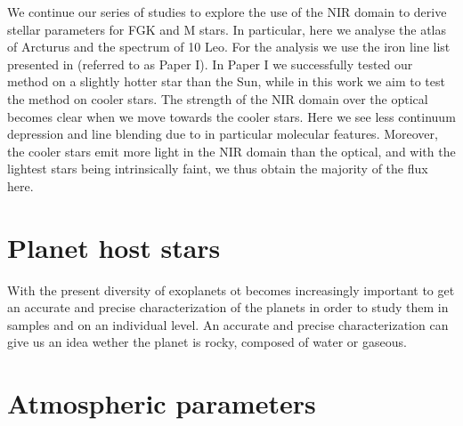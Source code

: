 We continue our series of studies to explore the use of the NIR domain to derive
stellar parameters for FGK and M stars. In particular, here we analyse the atlas
of Arcturus and the spectrum of 10 Leo. For the analysis we use the iron line
list presented in \citet{Andreasen2016} (referred to as Paper I). In Paper I we
successfully tested our method on a slightly hotter star than the Sun, while in
this work we aim to test the method on cooler stars. The strength of the NIR
domain over the optical becomes clear when we move towards the cooler stars.
Here we see less continuum depression and line blending due to in particular
molecular features. Moreover, the cooler stars emit more light in the NIR domain
than the optical, and with the lightest stars being intrinsically faint, we thus
obtain the majority of the flux here.



\section{Planet host stars}
\label{sec:Planet_host_stars}
With the present diversity of exoplanets ot becomes increasingly important
to get an accurate and precise characterization of the planets in order to
study them in samples and on an individual level. An accurate and precise
characterization can give us an idea wether the planet is rocky, composed
of water or gaseous.








\section{Atmospheric parameters}
\label{sec:Atmospheric_parameters}

